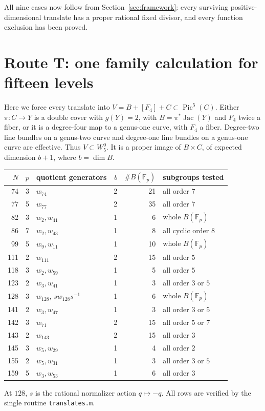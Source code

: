 \documentclass[11pt,a4paper]{article}
\newcommand{\F}{\mathbb F}
\newcommand{\Pic}{\operatorname{Pic}}
\newcommand{\Jac}{\operatorname{Jac}}
\newcommand{\W}{W^0_5}
\begin{document}
All nine cases now follow from Section~\ref{sec:framework}: every
surviving positive-dimensional translate has a proper rational fixed
divisor, and every function exclusion has been proved.

\section{Route T: one family calculation for fifteen levels}
\label{sec:translates}
Here we force every translate into
$V=B+[F_4]+C\subset\Pic^5(C)$.
Either $\pi:C\to Y$ is a double cover with $g(Y)=2$, with
$B=\pi^*\Jac(Y)$ and $F_4$ twice a fiber, or it is a degree-four map
to a genus-one curve, with $F_4$ a fiber.
Degree-two line bundles on a genus-two curve and degree-one line bundles
on a genus-one curve are effective. Thus $V\subset\W$.
It is a proper image of $B\times C$, of expected dimension $b+1$,
where $b=\dim B$.
\begin{center}\small
\begin{tabular}{@{}rrlrrl@{}}
\toprule $N$&$p$&quotient generators&$b$&$\#B(\F_p)$&subgroups tested\\
\midrule
74&3&$w_{74}$&2&21&all order $7$\\
77&5&$w_{77}$&2&35&all order $7$\\
82&3&$w_2,w_{41}$&1&6&whole $B(\F_p)$\\
86&7&$w_2,w_{43}$&1&8&all cyclic order $8$\\
99&5&$w_9,w_{11}$&1&10&whole $B(\F_p)$\\
111&2&$w_{111}$&2&15&all order $5$\\
118&3&$w_2,w_{59}$&1&5&all order $5$\\
123&2&$w_3,w_{41}$&1&3&all order $3$ or $5$\\
128&3&$w_{128},\,s w_{128}s^{-1}$&1&6&whole $B(\F_p)$\\
141&2&$w_3,w_{47}$&1&3&all order $3$ or $5$\\
142&3&$w_{71}$&2&15&all order $5$ or $7$\\
143&2&$w_{143}$&2&15&all order $3$\\
145&3&$w_5,w_{29}$&1&4&all order $2$\\
155&2&$w_5,w_{31}$&1&3&all order $3$ or $5$\\
159&5&$w_3,w_{53}$&1&6&all order $3$\\
\bottomrule
\end{tabular}
\end{center}
At $128$, $s$ is the rational normalizer action $q\mapsto-q$.
All rows are verified by the single routine \texttt{translates.m}.
\end{document}
